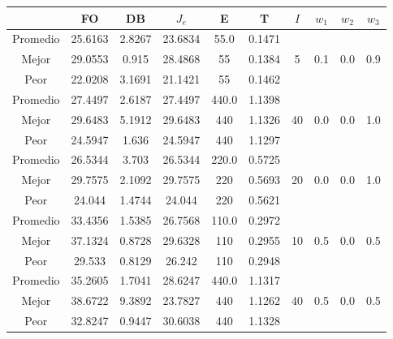\begin{table}[h!]
    \footnotesize
    \begin{center}
        \begin{tabular}{|c|c|c|c|c|c|c|c|c|c|}
        \hline
            & {\bf FO} & {\bf DB} & $J_e$ & {\bf E} & {\bf T} & $I$ & $w_1$ & $w_2$ & $w_3$ \\
        \hline
        \hline
            Promedio  & 25.6163 & 2.8267 & 23.6834 & 55.0 & 0.1471 &  &  &  & \\
            \cline{1-6}
            Mejor & 29.0553 & 0.915  & 28.4868 & 55 & 0.1384 & 5 & 0.1 & 0.0 & 0.9\\
            \cline{1-6}
            Peor & 22.0208 & 3.1691  & 21.1421 & 55 & 0.1462 &  &  &  & \\
        \hline
        \hline
            Promedio  & 27.4497 & 2.6187 & 27.4497 & 440.0 & 1.1398 &  &  &  & \\
            \cline{1-6}
            Mejor & 29.6483 & 5.1912  & 29.6483 & 440 & 1.1326 & 40 & 0.0 & 0.0 & 1.0\\
            \cline{1-6}
            Peor & 24.5947 & 1.636  & 24.5947 & 440 & 1.1297 &  &  &  & \\
        \hline
        \hline
            Promedio  & 26.5344 & 3.703 & 26.5344 & 220.0 & 0.5725 &  &  &  & \\
            \cline{1-6}
            Mejor & 29.7575 & 2.1092  & 29.7575 & 220 & 0.5693 & 20 & 0.0 & 0.0 & 1.0\\
            \cline{1-6}
            Peor & 24.044 & 1.4744  & 24.044 & 220 & 0.5621 &  &  &  & \\
        \hline
        \hline
            Promedio  & 33.4356 & 1.5385 & 26.7568 & 110.0 & 0.2972 &  &  &  & \\
            \cline{1-6}
            Mejor & 37.1324 & 0.8728  & 29.6328 & 110 & 0.2955 & 10 & 0.5 & 0.0 & 0.5\\
            \cline{1-6}
            Peor & 29.533 & 0.8129  & 26.242 & 110 & 0.2948 &  &  &  & \\
        \hline
        \hline
            Promedio  & 35.2605 & 1.7041 & 28.6247 & 440.0 & 1.1317 &  &  &  & \\
            \cline{1-6}
            Mejor & 38.6722 & 9.3892  & 23.7827 & 440 & 1.1262 & 40 & 0.5 & 0.0 & 0.5\\
            \cline{1-6}
            Peor & 32.8247 & 0.9447  & 30.6038 & 440 & 1.1328 &  &  &  & \\
        \hline
        \hline

\end{tabular}
\end{center}
\end{table}
